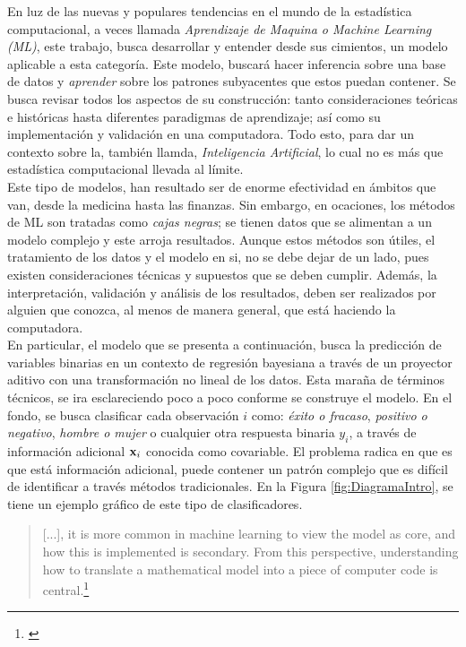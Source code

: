 \documentclass[../Main/Main.tex]{subfiles}
\begin{document}
En luz de las nuevas y populares tendencias en el mundo de la estadística computacional, a veces llamada \textit{Aprendizaje de Maquina o Machine Learning (ML)}, este trabajo, busca desarrollar y entender desde sus cimientos, un modelo aplicable a esta categoría. Este modelo, buscará hacer inferencia sobre una base de datos y \textit{aprender} sobre los patrones subyacentes que estos puedan contener. Se busca revisar todos los aspectos de su construcción: tanto consideraciones teóricas e históricas hasta diferentes paradigmas de aprendizaje; así como su implementación y validación en una computadora. Todo esto, para dar un contexto sobre la, también llamda, \textit{Inteligencia Artificial}, lo cual no es más que estadística computacional llevada al límite. \\

Este tipo de modelos, han resultado ser de enorme efectividad en  ámbitos que van, desde la medicina hasta las finanzas. Sin embargo, en ocaciones, los métodos de ML son tratadas como \textit{cajas negras}; se tienen datos que se alimentan a un modelo complejo y este arroja resultados. Aunque estos métodos son útiles, el tratamiento de los datos y el modelo en si, no se debe dejar de un lado, pues existen consideraciones técnicas y supuestos que se deben cumplir. Además, la interpretación, validación y análisis de los resultados, deben ser realizados por alguien que conozca, al menos de manera general, que está haciendo la computadora.\\

En particular, el modelo que se presenta a continuación, busca la predicción de variables binarias en un contexto de regresión bayesiana a través de un proyector aditivo con una transformación no lineal de los datos. Esta maraña de términos técnicos, se ira esclareciendo poco a poco conforme se construye el modelo. En el fondo, se busca clasificar cada observación $i$ como: \textit{éxito o fracaso}, \textit{positivo o negativo}, \textit{hombre o mujer} o cualquier otra respuesta binaria $y_i$, a través de información adicional $\mathbf{x}_i$ conocida como covariable. El problema radica en que es que está información adicional, puede contener un patrón complejo que es difícil de identificar a través métodos tradicionales. En la Figura \ref{fig:DiagramaIntro}, se tiene un ejemplo gráfico de este tipo de clasificadores. 

\begin{quote}
	[...], it is more common in machine learning to view the model as core, and how this is implemented
is secondary. From this perspective, understanding how to translate a mathematical model into a piece of
computer code is central.\footnote{\autocite{barber2012bayesian}}
\end{quote}
\end{document}
